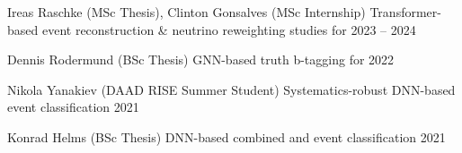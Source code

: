 


\begin{cvhonors}

  \cvhonor
    {Ireas Raschke \textmd{(MSc Thesis),} Clinton Gonsalves \textmd{(MSc Internship)}} %
    {%
      \newline
      Transformer-based event reconstruction \& neutrino reweighting studies for \ttHWW  %
    } %
    {} %
    {2023 -- 2024} %


  \cvhonor
    {Dennis Rodermund \textmd{(BSc Thesis)}} %
    {%
      \newline
      GNN-based truth b-tagging for \ttHbb  %
    } %
    {} %
    {2022} %

  \cvhonor
    {Nikola Yanakiev \textmd{(DAAD RISE Summer Student)}} %
    {%
      \newline
      Systematics-robust DNN-based \ttHbb event classification  %
    } %
    {} %
    {2021} %

  \cvhonor
    {Konrad Helms \textmd{(BSc Thesis)}} %
    {%
      \newline
      DNN-based combined \ttHbb and \tHbb event classification  %
    } %
    {} %
    {2021} %

\end{cvhonors}
